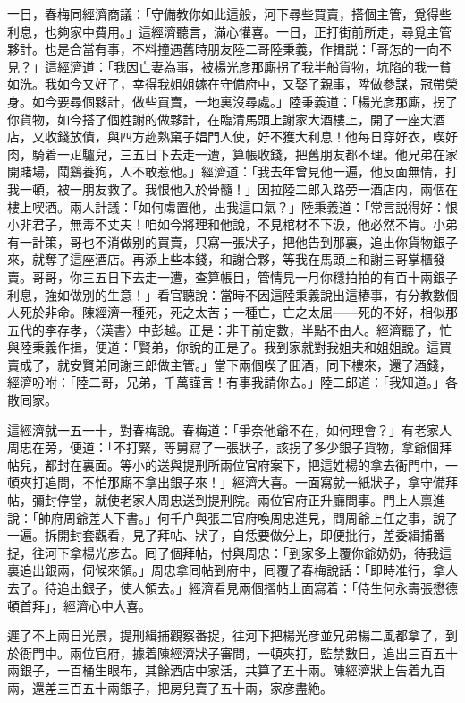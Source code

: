 一日，春梅同經濟商議：「守備教你如此這般，河下尋些買賣，搭個主管，覓得些利息，也夠家中費用。」這經濟聽言，滿心懽喜。一日，正打街前所走，尋覓主管夥計。也是合當有事，不料撞遇舊時朋友陸二哥陸秉義，作揖説：「哥怎的一向不見？」這經濟道：「我因亡妻為事，被楊光彦那廝拐了我半船貨物，坑陷的我一貧如洗。我如今又好了，幸得我姐姐嫁在守備府中，又娶了親事，陞做參謀，冠帶榮身。如今要尋個夥計，做些買賣，一地裏沒尋處。」陸秉義道：「楊光彦那廝，拐了你貨物，如今搭了個姓謝的做夥計，在臨清馬頭上謝家大酒樓上，開了一座大酒店，又收錢放債，與四方趂熟窠子娼門人使，好不獲大利息！他每日穿好衣，喫好肉，騎着一疋驢兒，三五日下去走一遭，算帳收錢，把舊朋友都不理。他兄弟在家開賭場，鬦鷄養狗，人不敢惹他。」經濟道：「我去年曾見他一遍，他反面無情，打我一頓，被一朋友救了。我恨他入於骨髓！」因拉陸二郎入路旁一酒店内，兩個在樓上喫酒。兩人計議：「如何䖏置他，出我這口氣？」陸秉義道：「常言説得好：恨小非君子，無毒不丈夫！咱如今將理和他說，不見棺材不下淚，他必然不肯。小弟有一計策，哥也不消做别的買賣，只寫一張狀子，把他告到那裏，追出你貨物銀子來，就奪了這座酒店。再添上些本錢，和謝合夥，等我在馬頭上和謝三哥掌櫃發賣。哥哥，你三五日下去走一遭，查算帳目，管情見一月你穩拍拍的有百十兩銀子利息，強如做别的生意！」看官聽說：當時不因這陸秉義說出這樁事，有分教數個人死於非命。陳經濟一種死，死之太苦；一種亡，亡之太屈——死的不好，相似那五代的李存孝，〈漢書〉中彭越。正是：非干前定數，半點不由人。經濟聽了，忙與陸秉義作揖，便道：「賢弟，你說的正是了。我到家就對我姐夫和姐姐說。這買賣成了，就安賢弟同謝三郎做主管。」當下兩個喫了囬酒，同下樓來，還了酒錢，經濟吩咐：「陸二哥，兄弟，千萬謹言！有事我請你去。」陸二郎道：「我知道。」各散囘家。

這經濟就一五一十，對春梅說。春梅道：「爭奈他爺不在，如何理會？」有老家人周忠在旁，便道：「不打緊，等舅寫了一張狀子，該拐了多少銀子貨物，拿爺個拜帖兒，都封在裏面。等小的送與提刑所兩位官府案下，把這姓楊的拿去衙門中，一頓夾打追問，不怕那廝不拿出銀子來！」經濟大喜。一面寫就一紙狀子，拿守備拜帖，彌封停當，就使老家人周忠送到提刑院。兩位官府正升廳問事。門上人禀進說：「帥府周爺差人下書。」何千户與張二官府喚周忠進見，問周爺上任之事，說了一遍。拆開封套觀看，見了拜帖、狀子，自恁要做分上，即便批行，差委緝捕番捉，往河下拿楊光彦去。囘了個拜帖，付與周忠：「到家多上覆你爺奶奶，待我這裏追出銀兩，伺候來領。」周忠拿囘帖到府中，囘覆了春梅說話：「即時准行，拿人去了。待追出銀子，使人領去。」經濟看見兩個摺帖上面寫着：「侍生何永壽張懋德頓首拜」，經濟心中大喜。

遲了不上兩日光景，提刑緝捕觀察番捉，往河下把楊光彦並兄弟楊二風都拿了，到於衙門中。兩位官府，據着陳經濟狀子審問，一頓夾打，監禁數日，追出三百五十兩銀子，一百桶生眼布，其餘酒店中家活，共算了五十兩。陳經濟狀上告着九百兩，還差三百五十兩銀子，把房兒賣了五十兩，家彦盡絶。

